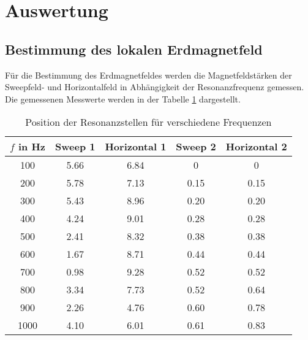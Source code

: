 \section{Auswertung}
\label{sec:Auswertung}
\subsection{Bestimmung des lokalen Erdmagnetfeld}
Für die Bestimmung des Erdmagnetfeldes werden die Magnetfeldstärken der
Sweepfeld- und Horizontalfeld in Abhängigkeit der Resonanzfrequenz gemessen.
Die gemessenen Messwerte werden in der Tabelle \ref{tabmess1} dargestellt.
 \begin{table}
   \centering
   \caption{Position der Resonanzstellen für verschiedene Frequenzen}
   \label{tabmess1}
   \begin{tabular}{c|c|c|c|c}
     \toprule
    $f$ in Hz & Sweep 1& Horizontal 1 & Sweep 2&Horizontal 2 \\
     \midrule
     100 &  5.66 &  6.84  & 0   &   0   \\
     200 &  5.78 & 7.13  & 0.15 &  0.15  \\
     300 &  5.43 & 8.96  & 0.20 &  0.20 \\
     400 &  4.24 & 9.01  & 0.28 &  0.28 \\
     500 &  2.41 & 8.32  & 0.38 &  0.38 \\
     600 &  1.67 & 8.71  & 0.44 &  0.44 \\
     700 &  0.98 & 9.28  & 0.52 &  0.52 \\
     800 &  3.34 & 7.73  & 0.52 &  0.64 \\
     900 &  2.26 & 4.76  & 0.60 &  0.78 \\
     1000 & 4.10 & 6.01  & 0.61 &  0.83 \\
     \bottomrule
   \end{tabular}
 \end{table}





